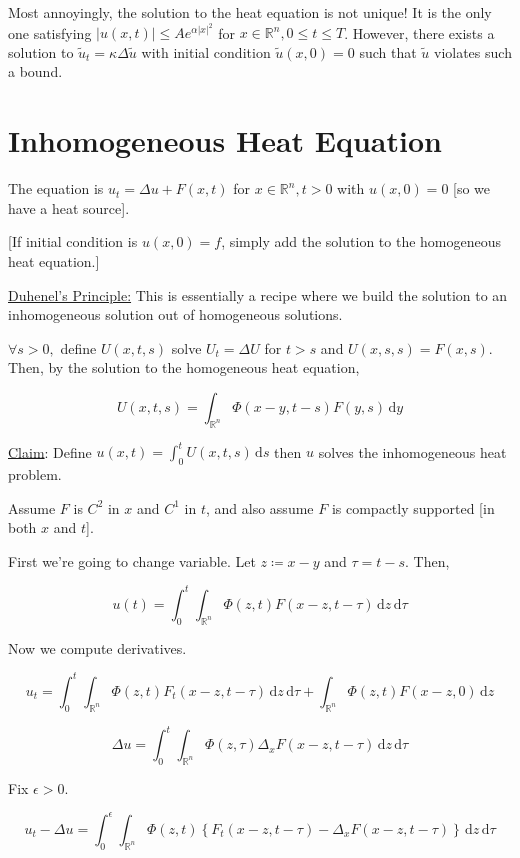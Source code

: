 \documentclass{article}
\theoremstyle{definition}
\begin{document}
Most annoyingly, the solution to the heat equation is not unique! It is the only one satisfying \(\vert u(x,t) \vert \leq A e^{\alpha \vert x \vert ^2}\) for \(x\in\mathbb{R}^n, 0\leq t \leq T\). However, there exists a solution to \(\tilde u_t = \kappa \Delta \tilde u\) with initial condition \(\tilde u(x,0)=0\) such that \(\tilde u\) violates such a bound.

\section*{Inhomogeneous Heat Equation}

The equation is \(u_t = \Delta u + F(x,t)\) for \(x\in \mathbb{R}^n,t>0\) with \(u(x,0)=0\) [so we have a heat source].

[If initial condition is \(u(x,0)=f\), simply add the solution to the homogeneous heat equation.]

\underline{Duhenel's Principle:} This is essentially a recipe where we build the solution to an inhomogeneous solution out of homogeneous solutions.

\(\forall s > 0,\) define \(U(x,t,s)\) solve \(U_t = \Delta U\) for \(t > s\) and \(U(x,s,s)=F(x,s)\). Then, by the solution to the homogeneous heat equation,

\[
    U(x,t,s) = \int_{\mathbb{R}^n}^{} \Phi(x-y,t-s)F(y,s) \,\mathrm{d}y 
\]

\underline{Claim}: Define \(u(x,t)=\displaystyle \int_{0}^{t} U(x,t,s) \,\mathrm{d}s \) then \(u\) solves the inhomogeneous heat problem.

Assume \(F\) is \(C^2\) in \(x\) and \(C^1\) in \(t\), and also assume \(F\) is compactly supported [in both \(x\) and \(t\)].

First we're going to change variable. Let \(z\coloneqq x - y\) and \(\tau = t - s\). Then,

\[
    u(t) = \int_{0}^{t} \int_{\mathbb{R}^n}^{} \Phi(z,t) F(x-z,t-\tau) \,\mathrm{d}z \,\mathrm{d}\tau 
\]

Now we compute derivatives.

\[
    u_t = \int_{0}^{t} \int_{\mathbb{R}^n}^{} \Phi(z,t)F_t(x-z,t-\tau) \,\mathrm{d}z  \,\mathrm{d}\tau + \int_{\mathbb{R}^n}^{} \Phi(z,t)F(x-z,0) \,\mathrm{d}z 
\]

\[
    \Delta u = \int_{0}^{t} \int_{\mathbb{R}^n}^{} \Phi(z,\tau)\Delta_x F(x-z,t-\tau) \,\mathrm{d}z  \,\mathrm{d}\tau 
\]

Fix \(\epsilon > 0\).

\[
    u_t - \Delta u = \int_{0}^{\epsilon} \int_{\mathbb{R}^n}^{} \Phi(z,t) \left\{ F_t(x-z,t-\tau) - \Delta_x F(x-z,t-\tau) \right\}  \,\mathrm{d}z \,\mathrm{d}\tau 
\]
\end{document}
